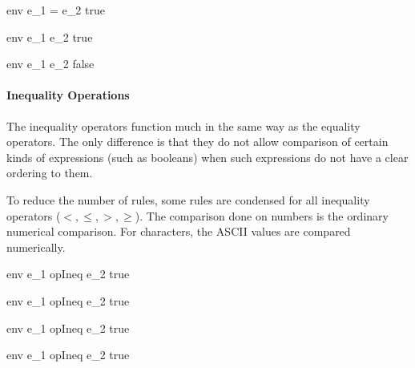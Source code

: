 \documentclass{article}
\begin{document}
    {\mbox{env} \vdash e_1 = e_2 \Downarrow true}

\bigskip

    {\mbox{env} \vdash e_1 \neq e_2 \Downarrow true}

    {\mbox{env} \vdash e_1 \neq e_2 \Downarrow false}

\bigskip

\paragraph{Inequality Operations}
The inequality operators function much in the same way as the equality operators.
The only difference is that they do not allow comparison of certain kinds of expressions (such as booleans) when such expressions do not have a clear ordering to them.

To reduce the number of rules, some rules are condensed for all inequality operators ($<, \leq, >, \geq$).
The comparison done on numbers is the ordinary numerical comparison.
For characters, the ASCII values are compared numerically.

    {\mbox{env} \vdash e_1 \; opIneq \; e_2 \Downarrow true}

    {\mbox{env} \vdash e_1 \; opIneq \; e_2 \Downarrow true}

\medskip

    {\mbox{env} \vdash e_1 \; opIneq \; e_2 \Downarrow true}

    {\mbox{env} \vdash e_1 \; opIneq \; e_2 \Downarrow true}
\end{document}
